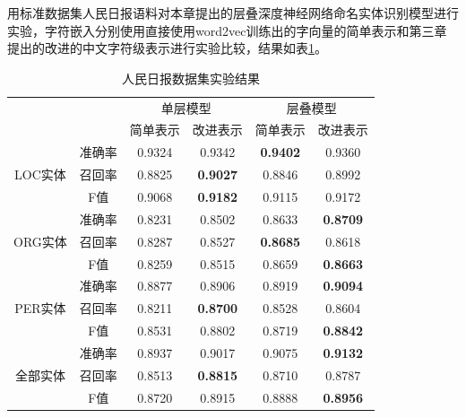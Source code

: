 \documentclass[winfonts,master,oneside,nobackinfo]{njuthesis}
\begin{document}
用标准数据集人民日报语料对本章提出的层叠深度神经网络命名实体识别模型进行实验，字符嵌入分别使用直接使用word2vec训练出的字向量的简单表示和第三章提出的改进的中文字符级表示进行实验比较，结果如表\ref{renmin}。

\begin{table}[h]
\centering
\begin{tabular}{|c|c|c|c|c|c|}
\hline
\multicolumn{2}{|c|}{\multirow{2}{*}{}} & \multicolumn{2}{c|}{单层模型} & \multicolumn{2}{c|}{层叠模型} \\ \cline{3-6} 
\multicolumn{2}{|c|}{}                  & 简单表示     & 改进表示    & 简单表示     & 改进表示    \\ \hline
\multirow{3}{*}{LOC实体}       & 准确率      & 0.9324       & 0.9342     & \textbf{0.9402}       & 0.9360     \\ \cline{2-6} 
                             & 召回率      & 0.8825       & \textbf{0.9027}     & 0.8846       & 0.8992     \\ \cline{2-6} 
                             & F值       & 0.9068       & \textbf{0.9182}     & 0.9115       & 0.9172     \\ \hline
\multirow{3}{*}{ORG实体}       & 准确率      & 0.8231       & 0.8502     & 0.8633       & \textbf{0.8709}     \\ \cline{2-6} 
                             & 召回率      & 0.8287       & 0.8527     & \textbf{0.8685}       & 0.8618     \\ \cline{2-6} 
                             & F值       & 0.8259       & 0.8515     & 0.8659       & \textbf{0.8663}     \\ \hline
\multirow{3}{*}{PER实体}       & 准确率      & 0.8877       & 0.8906     & 0.8919       & \textbf{0.9094}     \\ \cline{2-6} 
                             & 召回率      & 0.8211       & \textbf{0.8700}     & 0.8528       & 0.8604     \\ \cline{2-6} 
                             & F值       & 0.8531       & 0.8802     & 0.8719       & \textbf{0.8842}     \\ \hline
\multirow{3}{*}{全部实体}        & 准确率      & 0.8937       & 0.9017     & 0.9075       & \textbf{0.9132}     \\ \cline{2-6} 
                             & 召回率      & 0.8513       & \textbf{0.8815}     & 0.8710       & 0.8787     \\ \cline{2-6} 
                             & F值       & 0.8720       & 0.8915     & 0.8888       & \textbf{0.8956}     \\ \hline
\end{tabular}
\caption{人民日报数据集实验结果}
\label{renmin}
\end{table}
\end{document}
